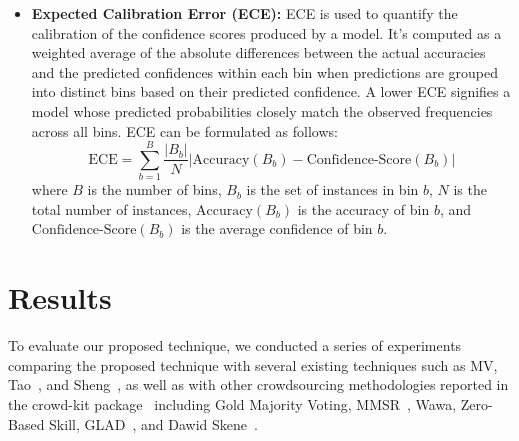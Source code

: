 \begin{itemize}
%
\item \textbf{Expected Calibration Error (ECE):} ECE is used to quantify the calibration of the confidence scores produced by a model. It's computed as a weighted average of the absolute differences between the actual accuracies and the predicted confidences within each bin when predictions are grouped into distinct bins based on their predicted confidence. A lower ECE signifies a model whose predicted probabilities closely match the observed frequencies across all bins. ECE can be formulated as follows:
\begin{equation}
\text{ECE} = \sum_{b=1}^{B} \frac{|B_b|}{N} \left\vert{\text{Accuracy}(B_b) - \text{Confidence-Score}(B_b)}\right\vert
\end{equation}
where $B$ is the number of bins, $B_b$ is the set of instances in bin $b$, $N$ is the total number of instances, $\text{Accuracy}(B_b)$ is the accuracy of bin $b$, and $\text{Confidence-Score}(B_b)$ is the average confidence of bin $b$.
%
\end{itemize}

\section{Results}\label{sec:crowd.results}
To evaluate our proposed technique, we conducted a series of experiments comparing the proposed technique with several existing techniques such as MV, Tao~\cite{tao_Label_2020}, and Sheng~\cite{sheng_Majority_2019}, as well as with other crowdsourcing methodologies reported in the crowd-kit package~\cite{ustalov_learning_2021 } including Gold Majority Voting, MMSR~\cite{ma_Adversarial_2020}, Wawa, Zero-Based Skill, GLAD~\cite{whitehill_Whose_2009}, and Dawid Skene~\cite{dawid_Maximum_1979}.


